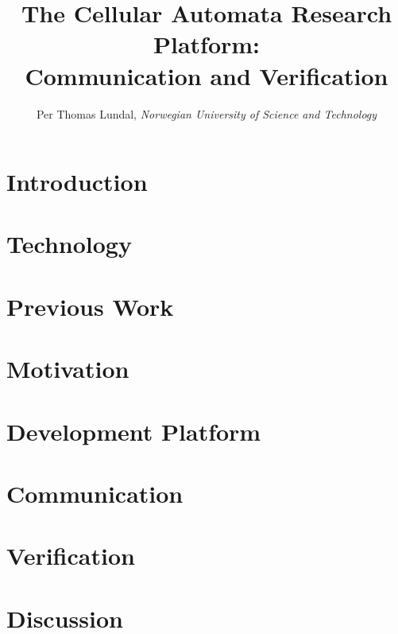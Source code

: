 \documentclass[a4paper]{IEEEtran}
\title{The Cellular Automata Research Platform: \\ Communication and Verification}
\author{Per Thomas Lundal, \emph{Norwegian University of Science and Technology}}
\begin{document}
\maketitle

\begin{abstract}

    

\end{abstract}

\section{Introduction}

    

\section{Technology}
    \label{sec:background}
    

\section{Previous Work}
    \label{sec:previous-work}
    

\section{Motivation}
    \label{sec:motivation}
    

\section{Development Platform}
    \label{sec:development}
    

\section{Communication}
    \label{sec:communication}
    

\section{Verification}
    \label{sec:verification}
    

\section{Discussion}
    \label{sec:discussion}
    
\end{document}
